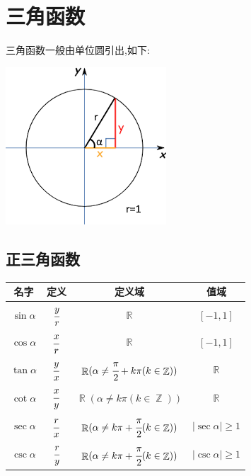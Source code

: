 \documentclass[UTF8,12pt]{ctexbook}
\newcommand{\absoluteValue}[1]{\left\lvert #1 \right\vert}
\newcommand{\mediumBigCase}[1]{\left[#1\right]}
\DeclareMathOperator{\mathRealNumberCollection}{\mathbb{R}}
\DeclareMathOperator{\mathIntegerCollection}{\mathbb{Z}}
\begin{document}
{{}%

\section{三角函数}{
三角函数一般由单位圆引出,如下:

\begin{center}
  \includegraphics{resources/UnitCircle.png}
\end{center}

\subsection{正三角函数}{
  \begin{tabular}{|c|c|c|c|}
    \hline
    名字           & 定义           & 定义域                                                                                       & 值域                                \\
    \hline
    $\sin{\alpha}$ & $\cfrac{y}{r}$ & $\mathRealNumberCollection$                                                                  & $\mediumBigCase{-1,1}$              \\
    \hline
    $\cos{\alpha}$ & $\cfrac{x}{r}$ & $\mathRealNumberCollection$                                                                  & $\mediumBigCase{-1,1}$              \\
    \hline
    $\tan{\alpha}$ & $\cfrac{y}{x}$ & $\mathRealNumberCollection(\alpha \neq \cfrac{\pi}{2} + k\pi(k \in \mathIntegerCollection))$ & $\mathRealNumberCollection$         \\
    \hline
    $\cot{\alpha}$ & $\cfrac{x}{y}$ & $\mathRealNumberCollection(\alpha \neq k\pi(k \in \mathIntegerCollection))$                  & $\mathRealNumberCollection$         \\
    \hline
    $\sec{\alpha}$ & $\cfrac{r}{x}$ & $\mathRealNumberCollection(\alpha \neq k\pi + \cfrac{\pi}{2}(k \in \mathIntegerCollection))$ & $\absoluteValue{\sec\alpha} \geq 1$ \\
    \hline
    $\csc{\alpha}$ & $\cfrac{r}{y}$ & $\mathRealNumberCollection(\alpha \neq k\pi + \cfrac{\pi}{2}(k \in \mathIntegerCollection))$ & $\absoluteValue{\csc\alpha} \geq 1$ \\
    \hline
  \end{tabular}
}%

}}
\end{document}

